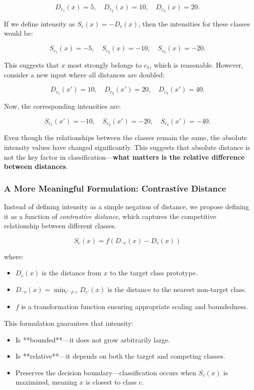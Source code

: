 \documentclass[12pt]{article}
\begin{document}
\[
D_{c_1}(x) = 5, \quad D_{c_2}(x) = 10, \quad D_{c_3}(x) = 20.
\]

If we define intensity as \( S_c(x) = -D_c(x) \), then the intensities for these classes would be:

\[
S_{c_1}(x) = -5, \quad S_{c_2}(x) = -10, \quad S_{c_3}(x) = -20.
\]

This suggests that \( x \) most strongly belongs to \( c_1 \), which is reasonable. However, consider a new input where all distances are doubled:

\[
D_{c_1}(x') = 10, \quad D_{c_2}(x') = 20, \quad D_{c_3}(x') = 40.
\]

Now, the corresponding intensities are:

\[
S_{c_1}(x') = -10, \quad S_{c_2}(x') = -20, \quad S_{c_3}(x') = -40.
\]

Even though the relationships between the classes remain the same, the absolute intensity values have changed significantly. This suggests that absolute distance is not the key factor in classification—\textbf{what matters is the relative difference between distances}.

\subsubsection{A More Meaningful Formulation: Contrastive Distance}

Instead of defining intensity as a simple negation of distance, we propose defining it as a function of \textit{contrastive distance}, which captures the competitive relationship between different classes.

\[
S_c(x) = f(D_{\neg c}(x) - D_c(x))
\]

where:

\begin{itemize}
    \item \( D_c(x) \) is the distance from \( x \) to the target class prototype.
    \item \( D_{\neg c}(x) = \min_{c' \neq c} D_{c'}(x) \) is the distance to the nearest non-target class.
    \item \( f \) is a transformation function ensuring appropriate scaling and boundedness.
\end{itemize}

This formulation guarantees that intensity:

\begin{itemize}
    \item Is **bounded**—it does not grow arbitrarily large.
    \item Is **relative**—it depends on both the target and competing classes.
    \item Preserves the decision boundary—classification occurs when \( S_c(x) \) is maximized, meaning \( x \) is closest to class \( c \).
\end{itemize}
\end{document}
